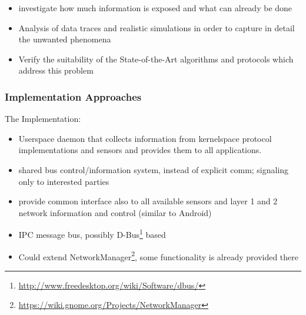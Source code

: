 \begin{itemize}
	\item investigate how much information is exposed and what can already be done
	\item Analysis of data traces and realistic simulations in order to capture in detail the unwanted phenomena
	\item Verify the suitability of the State-of-the-Art algorithms and protocols which address this problem
\end{itemize}



\subsubsection{Implementation Approaches}

The Implementation:
\begin{itemize}
	\item Userspace daemon that collects information from kernelspace protocol implementations and sensors and provides them to all applications.
	\item shared bus control/information system, instead of explicit comm; signaling only to interested parties
	\item provide common interface also to all available sensors and layer 1 and 2 network information and control (similar to Android)
	\item IPC message bus, possibly D-Bus\footnote{\url{http://www.freedesktop.org/wiki/Software/dbus/}} based
	\item Could extend NetworkManager\footnote{\url{https://wiki.gnome.org/Projects/NetworkManager}}, some functionality is already provided there

\end{itemize}










